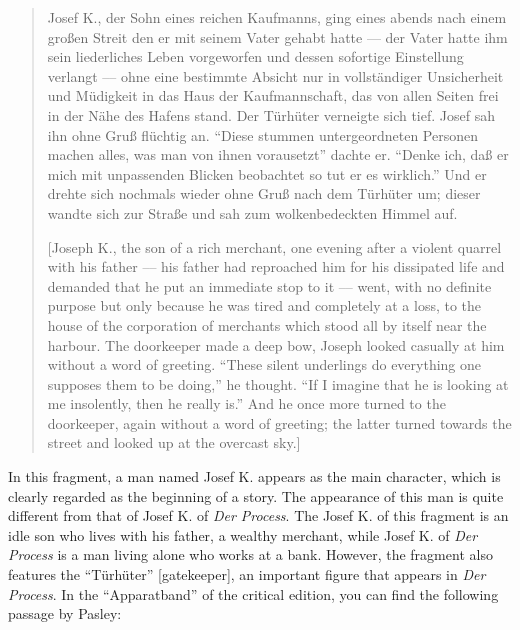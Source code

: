 \begin{paper}
\begin{quote}
Josef K., der Sohn eines reichen Kaufmanns, ging eines abends nach einem
großen Streit den er mit seinem Vater gehabt hatte –– der Vater hatte
ihm sein liederliches Leben vorgeworfen und dessen sofortige Einstellung
verlangt –– ohne eine bestimmte Absicht nur in vollständiger
Unsicherheit und Müdigkeit in das Haus der Kaufmannschaft, das von allen
Seiten frei in der Nähe des Hafens stand. Der Türhüter verneigte sich
tief. Josef sah ihn ohne Gruß flüchtig an. ``Diese stummen
untergeordneten Personen machen alles, was man von ihnen vorausetzt''
dachte er. ``Denke ich, daß er mich mit unpassenden Blicken beobachtet so
tut er es wirklich.'' Und er drehte sich nochmals wieder ohne Gruß nach
dem Türhüter um; dieser wandte sich zur Straße und sah zum
wolkenbedeckten Himmel auf. 

\begin{flushright}
    \parencite[666--667]{kafka_tagebucher_1990}
\end{flushright}

{[}Joseph K., the son of a rich merchant, one evening after a violent
quarrel with his father –– his father had reproached him for his
dissipated life and demanded that he put an immediate stop to it ––
went, with no definite purpose but only because he was tired and
completely at a loss, to the house of the corporation of merchants which
stood all by itself near the harbour. The doorkeeper made a deep bow,
Joseph looked casually at him without a word of greeting. ``These silent
underlings do everything one supposes them to be doing,'' he thought. ``If
I imagine that he is looking at me insolently, then he really is.'' And
he once more turned to the doorkeeper, again without a word of greeting;
the latter turned towards the street and looked up at the overcast
sky.{]} 

\begin{flushright}
    \parencite[257]{kafka_diaries_1975}
\end{flushright}

\end{quote}

In this fragment, a man named Josef K. appears as the main character,
which is clearly regarded as the beginning of a story. The appearance of
this man is quite different from that of Josef K. of \emph{Der Process}.
The Josef K. of this fragment is an idle son who lives with his father, a wealthy merchant, while Josef K. of \emph{Der Process} is a man
living alone who works at a bank. However, the fragment also features
the ``Türhüter'' {[}gatekeeper{]}, an important figure that appears
in \emph{Der Process}. In the ``Apparatband'' of the critical edition,
you can find the following passage by Pasley:


\end{paper}
